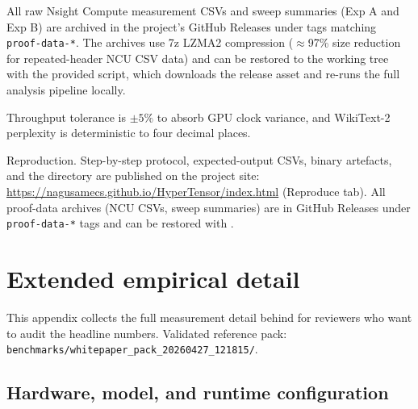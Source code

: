 \documentclass[11pt]{article}
\begin{document}
All raw Nsight Compute measurement CSVs and sweep summaries (Exp A and Exp B)
are archived in the project's GitHub Releases under tags matching
\texttt{proof-data-*}. The archives use 7z LZMA2 compression ($\approx$97\%
size reduction for repeated-header NCU CSV data) and can be restored to the
working tree with the provided 
script, which downloads the release asset and re-runs the full analysis
pipeline locally.

Throughput tolerance is $\pm 5\%$ to absorb GPU clock variance, and
WikiText-2 perplexity is deterministic to four decimal places.

\smallskip\noindent Reproduction.
Step-by-step protocol, expected-output CSVs, binary artefacts, and
the  directory are published on the project site:
\url{https://nagusamecs.github.io/HyperTensor/index.html} (Reproduce tab).
All proof-data archives (NCU CSVs, sweep summaries) are in GitHub Releases
under \texttt{proof-data-*} tags and can be restored with
.

\section{Extended empirical detail}
\label{app:extended}

This appendix collects the full measurement detail behind
 for reviewers who want to
audit the headline numbers. Validated reference pack:
\texttt{benchmarks/whitepaper\_pack\_20260427\_121815/}.

\subsection{Hardware, model, and runtime configuration}
\end{document}
